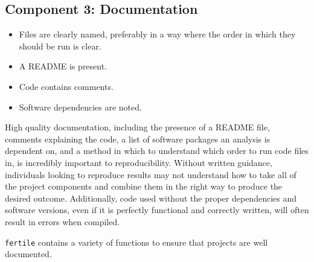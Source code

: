 \documentclass[12pt,twoside]{reedthesis}
\providecommand{\tightlist}{%
  \setlength{\itemsep}{0pt}\setlength{\parskip}{0pt}}
\begin{document}
\subsection{Component 3: Documentation}\label{component-3-documentation}
\begin{itemize}
\tightlist
\item
  Files are clearly named, preferably in a way where the order in which
  they should be run is clear.
\item
  A README is present.
\item
  Code contains comments.
\item
  Software dependencies are noted.
\end{itemize}
High quality documentation, including the presence of a README file,
comments explaining the code, a list of software packages an analysis is
dependent on, and a method in which to understand which order to run
code files in, is incredibly important to reproducibility. Without
written guidance, individuals looking to reproduce results may not
understand how to take all of the project components and combine them in
the right way to produce the desired outcome. Additionally, code used
without the proper dependencies and software versions, even if it is
perfectly functional and correctly written, will often result in errors
when compiled.

\texttt{fertile} contains a variety of functions to ensure that projects
are well documented.
\end{document}
